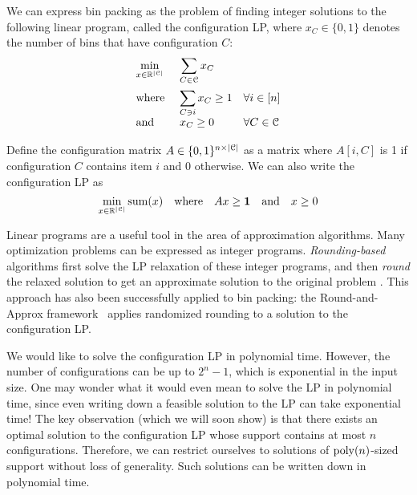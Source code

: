 We can express bin packing as the problem of finding integer solutions
to the following linear program, called the configuration LP,
where $x_C \in \{0, 1\}$ denotes the number of bins that have configuration $C$:
\[ \begin{array}{*3{>{\displaystyle}l}}
\min_{x \in \mathbb{R}^{|\Ccal|}} & \multicolumn{2}{>{\displaystyle}l}{\sum_{C \in \Ccal} x_C}
\\[1.5em] \textrm{where } & \sum_{C \ni i} x_C \ge 1 & \forall i \in [n]
\\[1em] \textrm{and } & x_C \ge 0 & \forall C \in \Ccal
\end{array} \]

Define the configuration matrix $A \in \{0, 1\}^{n \times |\mathcal{C}|}$
as a matrix where $A[i, C]$ is 1 if configuration $C$ contains item $i$ and 0 otherwise.
We can also write the configuration LP as
\[ \min_{x \in \mathbb{R}^{|\mathcal{C}|}} \operatorname{sum}(x)
\quad\textrm{where}\quad Ax \ge \mathbf{1} \quad\textrm{and}\quad x \ge 0 \]

Linear programs are a useful tool in the area of approximation algorithms.
Many optimization problems can be expressed as integer programs.
\emph{Rounding-based} algorithms first solve the LP relaxation of these integer programs,
and then \emph{round} the relaxed solution to get an approximate solution to the original problem
\cite{daa:det-lp-round,daa:rand-lp-round,iterative-methods}.
This approach has also been successfully applied to bin packing:
the Round-and-Approx framework~\cite{rna,bansal2014binpacking}
applies randomized rounding to a solution to the configuration LP.

We would like to solve the configuration LP in polynomial time.
However, the number of configurations can be up to $2^n-1$,
which is exponential in the input size.
One may wonder what it would even mean to solve the LP in polynomial time,
since even writing down a feasible solution to the LP can take exponential time!
The key observation (which we will soon show) is that
there exists an optimal solution to the configuration LP
whose support contains at most $n$ configurations.
Therefore, we can restrict ourselves to solutions of $\operatorname{poly}(n)$-sized support
without loss of generality. Such solutions can be written down in polynomial time.

